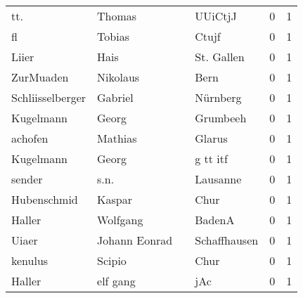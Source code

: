 \begin{center}
\begin{tiny}
\begin{longtabu}{llllrr}
                      tt. &                             Thomas &             &                                     UUiCtjJ &          0 &         1 \\
                       fl &                             Tobias &             &                                       Ctujf &          0 &         1 \\
                    Liier &                               Hais &             &                                  St. Gallen &          0 &         1 \\
                ZurMuaden &                           Nikolaus &             &                                        Bern &          0 &         1 \\
         Schliisselberger &                            Gabriel &             &                                    Nürnberg &          0 &         1 \\
                Kugelmann &                              Georg &             &                                    Grumbeeh &          0 &         1 \\
                  achofen &                            Mathias &             &                                      Glarus &          0 &         1 \\
                Kugelmann &                              Georg &             &                                    g tt itf &          0 &         1 \\
                   sender &                               s.n. &             &                                    Lausanne &          0 &         1 \\
              Hubenschmid &                             Kaspar &             &                                        Chur &          0 &         1 \\
                   Haller &                           Wolfgang &             &                                      BadenA &          0 &         1 \\
                    Uiaer &                      Johann Eonrad &             &                                Schaffhausen &          0 &         1 \\
                  kenulus &                             Scipio &             &                                        Chur &          0 &         1 \\
                   Haller &                           elf gang &             &                                         jAc &          0 &         1 \\

\end{longtabu}
\end{tiny}
\end{center}
